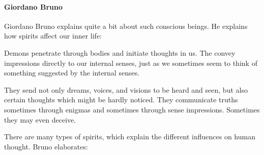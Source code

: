 \paragraph{Giordano Bruno}
Giordano Bruno explains quite a bit about such conscious beings. He explains how spirits affect our inner life:

\begin{quotex}
Demons penetrate through bodies and initiate thoughts in us. The convey impressions directly to our internal senses,
just as we sometimes seem to think of something suggested by the internal senses.

They send not only dreams, voices, and visions to be heard and seen, but also certain thoughts which might be hardly
noticed. They communicate truths sometimes through enigmas and sometimes through sense impressions. Sometimes they may
even deceive.

\end{quotex}
There are many types of spirits, which explain the different influences on human thought. Bruno elaborates:

